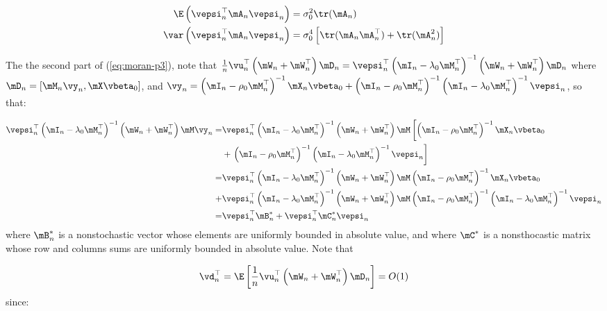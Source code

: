 \documentclass[english,12pt]{book}\usepackage[]{graphicx}\usepackage[]{xcolor}
\begin{document}
\begin{subappendices}
\begin{equation}
  \begin{aligned}
    \E\left(\vepsi_n^\top\mA_n\vepsi_n\right) & = \sigma_0^2\tr(\mA_n) \\
    \var\left(\vepsi_n^\top\mA_n\vepsi_n\right) & = \sigma^4_0\left[\tr(\mA_n\mA_n^\top)+\tr(\mA^2_n)\right]
  \end{aligned}
\end{equation}

The the second part of (\ref{eq:moran-p3}), note that $\frac{1}{n}\vu_n^\top\left(\mW_n + \mW_n^\top\right)\mD_n =\vepsi_n^\top\left(\mI_n-\lambda_0\mM_n^\top\right)^{-1}\left(\mW_n + \mW_n^\top\right)\mD_n$ where $\mD_n = \left[\mM_n\vy_n, \mX\vbeta_0\right]$, and $\vy_n = \left(\mI_n-\rho_0\mM_n^\top\right)^{-1}\mX_n\vbeta_0 + \left(\mI_n-\rho_0\mM_n^\top\right)^{-1}\left(\mI_n-\lambda_0\mM_n^\top\right)^{-1}\vepsi_n$, so that:

\begin{equation*}
\begin{aligned}
  \vepsi_n^\top\left(\mI_n-\lambda_0\mM_n^\top\right)^{-1}\left(\mW_n + \mW_n^\top\right)\mM\vy_n  = & \vepsi_n^\top\left(\mI_n-\lambda_0\mM_n^\top\right)^{-1}\left(\mW_n + \mW_n^\top\right)\mM\left[\left(\mI_n-\rho_0\mM_n^\top\right)^{-1}\mX_n\vbeta_0 \right. \\
  & + \left.\left(\mI_n-\rho_0\mM_n^\top\right)^{-1}\left(\mI_n-\lambda_0\mM_n^\top\right)^{-1}\vepsi_n\right] \\
= & \vepsi_n^\top\left(\mI_n-\lambda_0\mM_n^\top\right)^{-1}\left(\mW_n + \mW_n^\top\right)\mM\left(\mI_n-\rho_0\mM_n^\top\right)^{-1}\mX_n\vbeta_0 \\
 + & \vepsi_n^\top\left(\mI_n-\lambda_0\mM_n^\top\right)^{-1}\left(\mW_n + \mW_n^\top\right)\mM\left(\mI_n-\rho_0\mM_n^\top\right)^{-1}\left(\mI_n-\lambda_0\mM_n^\top\right)^{-1}\vepsi_n \\
 = & \vepsi_n^\top\mB^*_n + \vepsi_n^\top\mC^*_n\vepsi_n
  \end{aligned}
\end{equation*}
%
where $\mB_n^*$ is a nonstochastic vector whose elements are uniformly bounded in absolute value, and where $\mC^*$ is a nonsthocastic matrix whose row and columns sums are uniformly bounded in absolute value. Note that 

\begin{equation}\label{eq:moran-p4}
\vd_n^\top = \E\left[\frac{1}{n}\vu_n^\top\left(\mW_n + \mW_n^\top\right)\mD_n\right] = O(1)
\end{equation}
%
since:


\end{subappendices}
\end{document}
